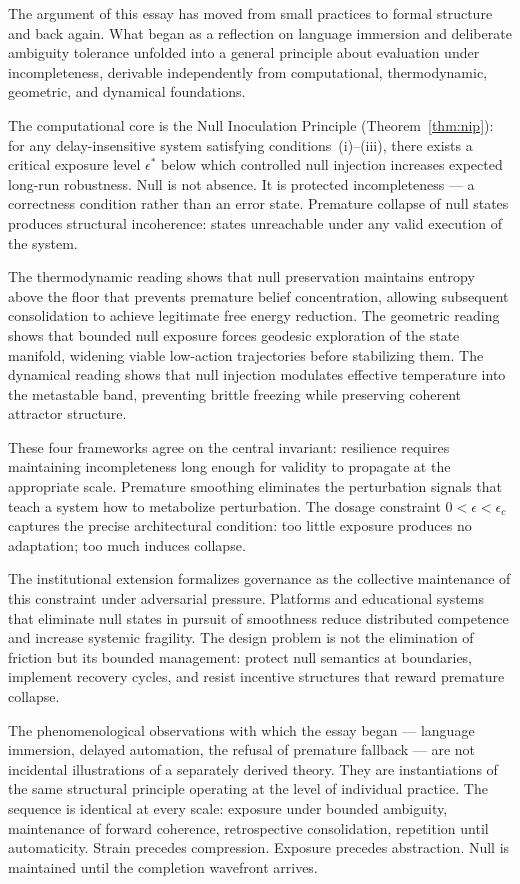\documentclass[11pt]{article}
\theoremstyle{remark}
\begin{document}
The argument of this essay has moved from small practices to formal structure and back again. What began as a reflection on language immersion and deliberate ambiguity tolerance unfolded into a general principle about evaluation under incompleteness, derivable independently from computational, thermodynamic, geometric, and dynamical foundations.

The computational core is the Null Inoculation Principle (Theorem~\ref{thm:nip}): for any delay-insensitive system satisfying conditions~(i)--(iii), there exists a critical exposure level $\epsilon^*$ below which controlled null injection increases expected long-run robustness. Null is not absence. It is protected incompleteness — a correctness condition rather than an error state. Premature collapse of null states produces structural incoherence: states unreachable under any valid execution of the system.

The thermodynamic reading shows that null preservation maintains entropy above the floor that prevents premature belief concentration, allowing subsequent consolidation to achieve legitimate free energy reduction. The geometric reading shows that bounded null exposure forces geodesic exploration of the state manifold, widening viable low-action trajectories before stabilizing them. The dynamical reading shows that null injection modulates effective temperature into the metastable band, preventing brittle freezing while preserving coherent attractor structure.

These four frameworks agree on the central invariant: resilience requires maintaining incompleteness long enough for validity to propagate at the appropriate scale. Premature smoothing eliminates the perturbation signals that teach a system how to metabolize perturbation. The dosage constraint $0 < \epsilon < \epsilon_c$ captures the precise architectural condition: too little exposure produces no adaptation; too much induces collapse.

The institutional extension formalizes governance as the collective maintenance of this constraint under adversarial pressure. Platforms and educational systems that eliminate null states in pursuit of smoothness reduce distributed competence and increase systemic fragility. The design problem is not the elimination of friction but its bounded management: protect null semantics at boundaries, implement recovery cycles, and resist incentive structures that reward premature collapse.

The phenomenological observations with which the essay began — language immersion, delayed automation, the refusal of premature fallback — are not incidental illustrations of a separately derived theory. They are instantiations of the same structural principle operating at the level of individual practice. The sequence is identical at every scale: exposure under bounded ambiguity, maintenance of forward coherence, retrospective consolidation, repetition until automaticity. Strain precedes compression. Exposure precedes abstraction. Null is maintained until the completion wavefront arrives.
\end{document}
